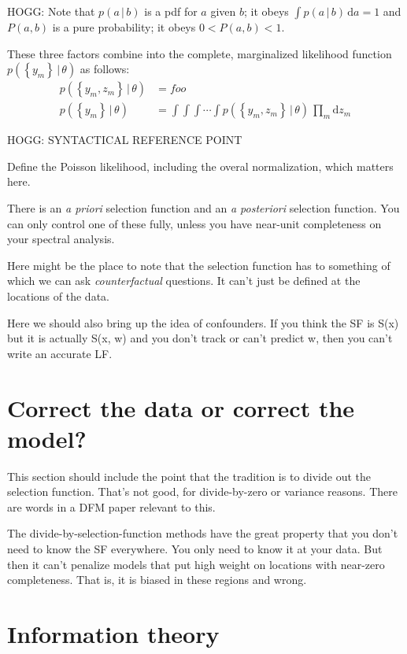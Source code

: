 \documentclass[modern]{aastex62}
\newcommand{\dd}{\mathrm{d}}
\newcommand{\given}{\,|\,}
\newcommand{\set}[1]{\left\{{#1}\right\}}
\newcommand{\foreign}[1]{\textsl{#1}}
\begin{document}
HOGG: Note that $p(a\given b)$ is a pdf for $a$ given $b$; it obeys
$\int p(a\given b)\,\dd a = 1$ and $P(a,b)$ is a pure probability; it
obeys $0<P(a, b)<1$.

These three factors combine into the complete, marginalized likelihood
function $p(\set{y_m}\given\theta)$ as follows:
\begin{align}
p(\set{y_m, z_m}\given\theta) &= foo
\\
p(\set{y_m}\given\theta) &= \int\!\int\!\int\!\cdots\int p(\set{y_m, z_m}\given\theta)\,\prod_m\dd z_m
\end{align}

HOGG: SYNTACTICAL REFERENCE POINT

Define the Poisson likelihood, including the overal normalization, which matters here.

There is an \foreign{a priori} selection function and an \foreign{a posteriori}
selection function. You can only control one of these fully, unless you have near-unit
completeness on your spectral analysis.

Here might be the place to note that the selection function has to something of
which we can ask \emph{counterfactual} questions. It can't just be defined at
the locations of the data.

Here we should also bring up the idea of confounders. If you think the SF
is S(x) but it is actually S(x, w) and you don't track or can't predict w,
then you can't write an accurate LF.

\section{Correct the data or correct the model?}

This section should include the point that the tradition is to divide out
the selection function. That's not good, for divide-by-zero or variance
reasons. There are words in a DFM paper relevant to this.

The divide-by-selection-function methods have the great property that you don't need
to know the SF everywhere. You only need to know it at your data. But then
it can't penalize models that put high weight on locations with near-zero
completeness. That is, it is biased in these regions and wrong.

\section{Information theory}
\end{document}
